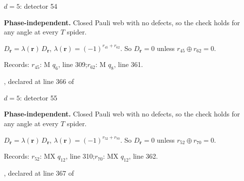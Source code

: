 \label{d5_det054}
{\Large $d=5$: detector 54}\par
\textbf{Phase-independent.} Closed Pauli web with no defects, so the check holds for any angle at every $T$ spider.
\begin{center}
\end{center}
\vspace{-1mm}
$D_{\boldsymbol r}=\lambda(\boldsymbol r)\,D_{\boldsymbol r}$, \quad $\lambda(\boldsymbol r)=(-1)^{r_{45}+r_{62}}$. \qquad So $D_{\boldsymbol r}=0$ unless $r_{45}\oplus r_{62}=0$.
\par\smallskip\begin{minipage}{.98\linewidth}\small Records: $r_{45}$: M $q_{6}$, line 309;\quad $r_{62}$: M $q_{8}$, line 361.\end{minipage}
\vfill
{\footnotesize\texttt{}, declared at line 366 of \texttt{}}
\newpage

\label{d5_det055}
{\Large $d=5$: detector 55}\par
\textbf{Phase-independent.} Closed Pauli web with no defects, so the check holds for any angle at every $T$ spider.
\begin{center}
\end{center}
\vspace{-1mm}
$D_{\boldsymbol r}=\lambda(\boldsymbol r)\,D_{\boldsymbol r}$, \quad $\lambda(\boldsymbol r)=(-1)^{r_{52}+r_{70}}$. \qquad So $D_{\boldsymbol r}=0$ unless $r_{52}\oplus r_{70}=0$.
\par\smallskip\begin{minipage}{.98\linewidth}\small Records: $r_{52}$: MX $q_{12}$, line 310;\quad $r_{70}$: MX $q_{12}$, line 362.\end{minipage}
\vfill
{\footnotesize\texttt{}, declared at line 367 of \texttt{}}
\newpage

